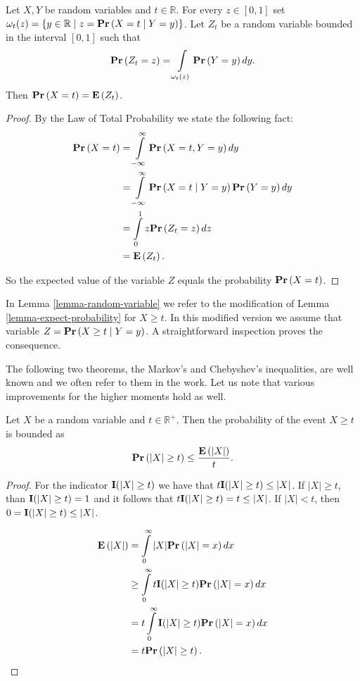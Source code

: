 \begin{lemma}
\label{lemma-expect-probability}
Let $X, Y$ be random variables and $t \in \mathbb{R}$. For every $z \in [0, 1]$ set $\omega_t(z) = \{y \in \mathbb{R} \mid z = \mathbf{Pr}\left(X = t \mid Y = y\right) \}$. Let $Z_t$ be a random variable bounded in the interval $[0, 1]$ such that \[\mathbf{Pr}\left(Z_t = z\right) = \int\limits_{\omega_t(z)} \mathbf{Pr}\left(Y = y\right) dy \text{.} \] Then $\mathbf{Pr}\left(X = t\right) = \mathbf{E}\left(Z_t\right)$.
\end{lemma}
\begin{proof}
By the Law of Total Probability we state the following fact:
\[
\begin{split}
\mathbf{Pr}\left(X = t\right) 
	& = \int\limits_{-\infty}^{\infty} \mathbf{Pr}\left(X = t, Y = y\right) dy \\
	& = \int\limits_{-\infty}^{\infty} \mathbf{Pr}\left(X = t \mid Y = y\right) \mathbf{Pr}\left(Y = y\right) dy \\
	& = \int\limits_{0}^{1} z \mathbf{Pr}\left(Z_t = z\right) dz \\
	& = \mathbf{E}\left(Z_t\right) \text{.}
\end{split}
\]

So the expected value of the variable $Z$ equals the probability $\mathbf{Pr}\left(X = t\right)$.
\end{proof}

In Lemma \ref{lemma-random-variable} we refer to the modification of Lemma \ref{lemma-expect-probability} for $X \geq t$. In this modified version we assume that variable $Z = \mathbf{Pr}\left(X \geq t \mid Y = y\right)$. A straightforward inspection proves the consequence.

The following two theorems, the Markov's \cite{557945} and Chebyshev's \cite{pFEL66a} inequalities, are well known and we often refer to them in the work. Let us note that various improvements for the higher moments hold as well.
\begin{theorem}
\label{theorem-markov-inequality}
Let $X$ be a random variable and $t \in \mathbb{R}^{+}$. Then the probability of the event $X \geq t$ is bounded as
\[
\mathbf{Pr}\left(|X| \geq t\right) \leq \frac{\mathbf{E}\left(|X|\right)}{t} \text{.}
\]
\end{theorem}
\begin{proof}
For the indicator $\mathbf{I}(|X| \geq t)$ we have that $t\mathbf{I}(|X| \geq t) \leq |X|$. If $|X| \geq t$, than $\mathbf{I}(|X| \geq t) = 1$ and it follows that $t\mathbf{I}(|X| \geq t) = t \leq |X|$. If $|X| < t$, then $0 = \mathbf{I}(|X| \geq t) \leq |X|$.

\[
\begin{split}
\mathbf{E}\left(|X|\right) 
	& = \int\limits_{0}^{\infty} |X| \mathbf{Pr}\left(|X| = x\right) dx \\
	& \geq \int\limits_{0}^{\infty} t \mathbf{I}(|X| \geq t) \mathbf{Pr}\left(|X| = x\right) dx \\
	& = t \int\limits_{0}^{\infty} \mathbf{I}(|X| \geq t) \mathbf{Pr}\left(|X| = x\right) dx \\
	& = t \mathbf{Pr}\left(|X| \geq t\right) \text{.}
\end{split}
\]
\end{proof}

